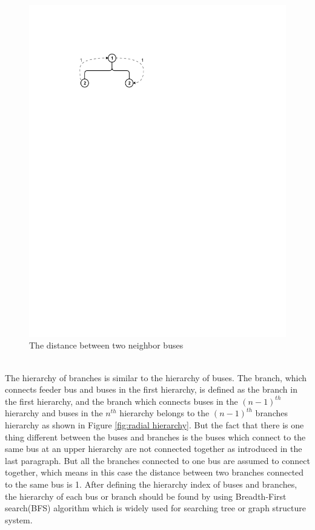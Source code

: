     \begin{figure}[!h]
        \centering
        \includegraphics{figures/distance_two_buses.pdf}
        \caption{The distance between two neighbor buses}
        \label{fig:distance_two_buses}
    \end{figure}
\bigskip
\\The hierarchy of branches is similar to the hierarchy of buses. The branch, which connects feeder bus and buses in the first hierarchy, is defined as the branch in the first hierarchy, and the branch which connects buses in the $(n-1)^{th}$ hierarchy and buses in the $n^{th}$ hierarchy belongs to the $(n-1)^{th}$ branches hierarchy as shown in Figure \ref{fig:radial hierarchy}. But the fact that there is one thing different between the buses and branches is the buses which connect to the same bus at an upper hierarchy are not connected together as introduced in the last paragraph. But all the branches connected to one bus are assumed to connect together, which means in this case the distance between two branches connected to the same bus is 1. After defining the hierarchy index of buses and branches, the hierarchy of each bus or branch should be found by using Breadth-First search(BFS) algorithm which is widely used for searching tree or graph structure system.

